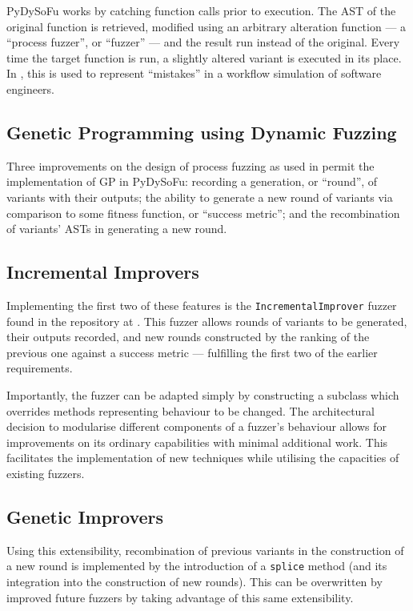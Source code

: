 \documentclass[draft,12pt]{llncs}   %
\begin{document}
PyDySoFu works by catching function calls prior to execution. The AST of the
original function is retrieved, modified using an arbitrary alteration function
--- a ``process fuzzer'', or ``fuzzer'' --- and the result run instead of the
original. Every time the target function is run, a slightly altered
variant is executed in its place. In \cite{wallis2018a}, this is used to represent
``mistakes'' in a workflow simulation of software engineers.\par

\subsection{Genetic Programming using Dynamic Fuzzing}
Three improvements on the design of process fuzzing as used in
\cite{wallis2018a} permit the implementation of GP in PyDySoFu: recording a
generation, or ``round'', of variants with their outputs; the ability to
generate a new round of variants via comparison to some fitness function, or
``success metric''; and the recombination of variants' ASTs in generating a new
round.\par

\subsection{Incremental Improvers}
Implementing the first two of these features is the \texttt{IncrementalImprover}
fuzzer found in the repository at \cite{pydysofu}. This fuzzer allows rounds of
variants to be generated, their outputs recorded, and new rounds constructed by
the ranking of the previous one against a success metric --- fulfilling the
first two of the earlier requirements.\par

Importantly, the fuzzer can be adapted simply by constructing a subclass which
overrides methods representing behaviour to be changed. The architectural
decision to modularise different components of a fuzzer's behaviour allows for
improvements on its ordinary capabilities with minimal additional work. This
facilitates the implementation of new techniques while utilising the capacities
of existing fuzzers.\par

\subsection{Genetic Improvers}

Using this extensibility, recombination of previous variants in the construction
of a new round is implemented by the introduction of a \texttt{splice} method
(and its integration into the construction of new rounds). This can be
overwritten by improved future fuzzers by taking advantage of this same
extensibility.\par
\end{document}
